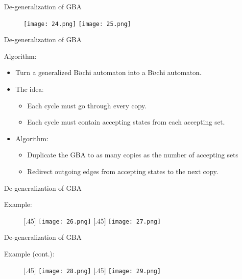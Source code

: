 \documentclass[17pt, t, lualatex]{beamer}
\begin{document}
\begin{frame}{De-generalization of GBA}
    \begin{figure}
        \centering
        \texttt{[image: 24.png]}
        \texttt{[image: 25.png]}
    \end{figure}
\end{frame}

\begin{frame}{De-generalization of GBA}
\begin{block}{Algorithm:}
    \begin{itemize}
        \item Turn a generalized B$\ddot{u}$chi automaton into a B$\ddot{u}$chi automaton.
        \item The idea:
        \begin{itemize}
            \item Each cycle must go through every copy.
            \item Each cycle must contain accepting states from each accepting set.
        \end{itemize}
        \item Algorithm:
        \begin{itemize}
            \item Duplicate the GBA to as many copies as the number of accepting sets
            \item Redirect outgoing edges from accepting states to the next copy.
        \end{itemize}
    \end{itemize}
\end{block}
\end{frame}

\begin{frame}{De-generalization of GBA}
\begin{block}{Example:}
    \begin{figure}[ht]
        [.45\linewidth]{%
        \texttt{[image: 26.png]}%
    }%
    \hfill
        [.45\linewidth]{%
        \texttt{[image: 27.png]}%
    }
\end{figure}
\end{block}
\end{frame}

\begin{frame}{De-generalization of GBA}
\begin{block}{Example (cont.):}
    \begin{figure}[ht]
        [.45\linewidth]{%
        \texttt{[image: 28.png]}%
    }%
    \hfill
        [.45\linewidth]{%
        \texttt{[image: 29.png]}%
    }
\end{figure}
\end{block}
\end{frame}
\end{document}

